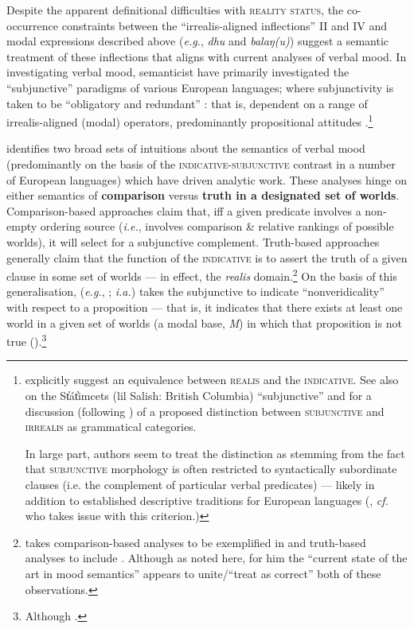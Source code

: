 Despite the apparent definitional difficulties with \textsc{reality status}, the co-occurrence constraints between the ``irrealis-aligned inflections'' \gls{II} and \gls{IV} and modal expressions described above (\textit{e.g.}, \textit{dhu }and\textit{ balaŋ(u)}) suggest a semantic treatment of these inflections that aligns with current analyses of verbal mood. In investigating verbal mood, semanticist have primarily investigated  the ``subjunctive'' paradigms of various European languages; where subjunctivity is taken to be ``obligatory and redundant'' : that is, dependent on a range of irrealis-aligned (modal) operators, predominantly propositional attitudes \citep{Palmer2001}.\footnote{\citet[238]{Chung} explicitly suggest an equivalence between \textsc{realis} and the \textsc{indicative}. See also \citealt{Matthewson2010} on the St̓át̓imcets (\gls{lil} Salish: British Columbia) ``subjunctive'' and for a discussion (following \citealt{Palmer2001}) of a proposed distinction between \textsc{subjunctive} and \textsc{irrealis} as grammatical categories.
	
	In large part, authors seem to treat the distinction as stemming from the fact that \textsc{subjunctive} morphology is often restricted to syntactically subordinate clauses (i.e. the complement of particular verbal predicates) --- likely in addition to established descriptive traditions for European languages (\citealp[see also][169\textit{ff}]{Mauri2016}, \textit{cf. }\citet[13, fn 9]{Matthewson2010} who takes issue with this criterion.)\label{SJVvIRR}}

\citet[§ 2.2]{Portner2018a} identifies two broad sets of intuitions about the semantics of verbal mood (predominantly on the basis of the \textsc{indicative-subjunctive} contrast in a number of European languages) which have driven analytic work. These analyses hinge on either semantics of \textbf{comparison} versus \textbf{truth in a designated set of worlds}. Comparison-based approaches claim that, iff a given predicate involves a non-empty ordering source (\textit{i.e.}, involves comparison \& relative rankings of possible worlds), it will select for a subjunctive complement. Truth-based approaches generally claim that the function  of the \textsc{indicative} is to assert the truth of a given clause in some set of worlds --- in effect, the \textit{realis} domain.\footnote{\citet{Portner2018a} takes comparison-based analyses to be exemplified in \citealt{Portner2012,Anand2013,Giorgi1997,Villalta2008} and truth-based analyses to include \citealt{Giannakidou2011,Farkas1992,Farkas2003,Huntley1984,Quer2001,Portner1997}. Although as noted here, for him the ``current state of the art in mood semantics'' appears to unite/``treat as correct'' both of these observations.} On the basis of this generalisation, \citeauthor{Gian2016} (\textit{e.g.}, \citeyear{Gian2016}; \citealp{Giannakidou2020} \textit{i.a.}) takes the subjunctive to indicate ``nonveridicality'' with respect to a proposition --- that is, it indicates that there exists at least one world in a given set of worlds (a modal base, \textit{M}) in which that proposition is not true ().\footnote{Although \citep[\textit{cf.}]{Wilt2016}.}

